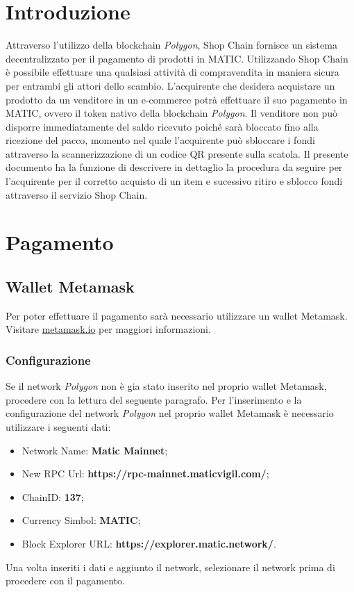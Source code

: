 \documentclass[a4paper, 12pt]{article}
\begin{document}
\makefrontpage
\tableofcontents
\newpage

\section{Introduzione}
Attraverso l'utilizzo della blockchain \textit{Polygon}, Shop Chain fornisce un sistema decentralizzato per il pagamento di prodotti in MATIC. Utilizzando Shop Chain è possibile effettuare una qualsiasi attività di compravendita in maniera sicura per entrambi gli attori dello scambio. L'acquirente che desidera acquistare un prodotto da un venditore in un e-commerce potrà effettuare il suo pagamento in MATIC, ovvero il token nativo della blockchain \textit{Polygon}. Il venditore non può disporre immediatamente del saldo ricevuto poiché sarà bloccato fino alla ricezione del pacco, momento nel quale l'acquirente può sbloccare i fondi attraverso la scannerizzazione di un codice QR presente sulla scatola.
Il presente documento ha la funzione di descrivere in dettaglio la procedura da seguire per l'acquirente per il corretto acquisto di un item e sucessivo ritiro e sblocco fondi attraverso il servizio Shop Chain.


\section{Pagamento}
\subsection{Wallet Metamask}
Per poter effettuare il pagamento sarà necessario utilizzare un wallet Metamask. Visitare \href{https://www.metamask.io}{metamask.io} per maggiori informazioni.
\subsubsection{Configurazione}
Se il network \textit{Polygon} non è gia stato inserito nel proprio wallet Metamask, procedere con la lettura del seguente paragrafo.
Per l'inserimento e la configurazione del network \textit{Polygon} nel proprio wallet Metamask è necessario utilizzare i seguenti dati:
\begin{itemize}
\item Network Name: \textbf{Matic Mainnet};
\item New RPC Url: \textbf{https://rpc-mainnet.maticvigil.com/};
\item ChainID: \textbf{137};
\item Currency Simbol: \textbf{MATIC};
\item Block Explorer URL: \textbf{https://explorer.matic.network/}.
\end{itemize}
Una volta inseriti i dati e aggiunto il network, selezionare il network prima di procedere con il pagamento.
\end{document}

